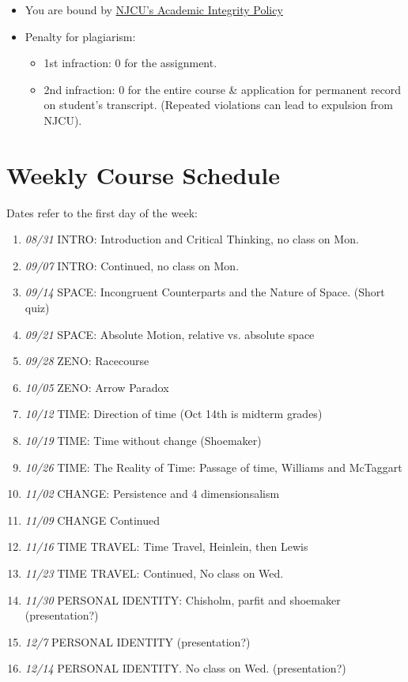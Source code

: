 \documentclass[11pt,article,oneside]{memoir}
\begin{document}
\begin{itemize} 
\item You are bound by \href{http://www.njcu.edu/uploadedFiles/About_NJCU/Governance_and_Organization/University_Senate/Policies/Academic\%20INTEGRITY\%20POLICY\%20FINAL\%202-04.pdf}{NJCU's Academic Integrity Policy}
\item Penalty for plagiarism:
\begin{itemize}
\item 1st infraction: 0 for the assignment. 
\item 2nd infraction: 0 for the entire course \& application for permanent record on student's transcript. (Repeated violations can lead to expulsion from NJCU). 
\end{itemize}
\end{itemize}


\section{Weekly Course Schedule}
Dates refer to the first day of the week: 
\begin{enumerate}
\item \textit{08/31} INTRO: Introduction and Critical Thinking, no class on Mon.
\item \textit{09/07} INTRO: Continued, no class on Mon. 
\item \textit{09/14} SPACE: Incongruent Counterparts and the Nature of Space. (Short quiz)
\item \textit{09/21} SPACE: Absolute Motion, relative vs. absolute space
\item \textit{09/28} ZENO: Racecourse
\item \textit{10/05} ZENO: Arrow Paradox
\item \textit{10/12} TIME: Direction of time (Oct 14th is midterm grades)
\item \textit{10/19} TIME: Time without change (Shoemaker)
\item  \textit{10/26} TIME: The Reality of Time: Passage of time, Williams and McTaggart
\item \textit{11/02} CHANGE: Persistence and 4 dimensionsalism
\item \textit{11/09} CHANGE Continued 
\item \textit{11/16} TIME TRAVEL: Time Travel, Heinlein, then Lewis
\item \textit{11/23} TIME TRAVEL: Continued,  No class on Wed.
\item \textit{11/30} PERSONAL IDENTITY: Chisholm, parfit and shoemaker (presentation?)
\item \textit{12/7} PERSONAL IDENTITY (presentation?)
\item \textit{12/14} PERSONAL IDENTITY. No class on Wed. (presentation?)
\end{enumerate}
\end{document}

